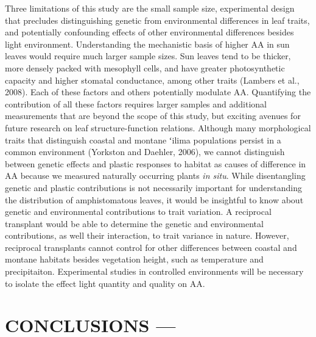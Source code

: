 \documentclass[
  letterpaper,
  DIV=11,
  numbers=noendperiod]{scrartcl}
\begin{document}
Three limitations of this study are the small sample size, experimental
design that precludes distinguishing genetic from environmental
differences in leaf traits, and potentially confounding effects of other
environmental differences besides light environment. Understanding the
mechanistic basis of higher \(\mathrm{AA}\) in sun leaves would require
much larger sample sizes. Sun leaves tend to be thicker, more densely
packed with mesophyll cells, and have greater photosynthetic capacity
and higher stomatal conductance, among other traits (Lambers et al.,
2008). Each of these factors and others potentially modulate
\(\mathrm{AA}\). Quantifying the contribution of all these factors
requires larger samples and additional measurements that are beyond the
scope of this study, but exciting avenues for future research on leaf
structure-function relations. Although many morphological traits that
distinguish coastal and montane ʻilima populations persist in a common
environment (Yorkston and Daehler, 2006), we cannot distinguish between
genetic effects and plastic responses to habitat as causes of difference
in \(\mathrm{AA}\) because we measured naturally occurring plants
\emph{in situ}. While disentangling genetic and plastic contributions is
not necessarily important for understanding the distribution of
amphistomatous leaves, it would be insightful to know about genetic and
environmental contributions to trait variation. A reciprocal transplant
would be able to determine the genetic and environmental contributions,
as well their interaction, to trait variance in nature. However,
reciprocal transplants cannot control for other differences between
coastal and montane habitats besides vegetation height, such as
temperature and precipitaiton. Experimental studies in controlled
environments will be necessary to isolate the effect light quantity and
quality on \(\mathrm{AA}\).

\hypertarget{conclusions}{%
\section{CONCLUSIONS ---}\label{conclusions}}
\end{document}

